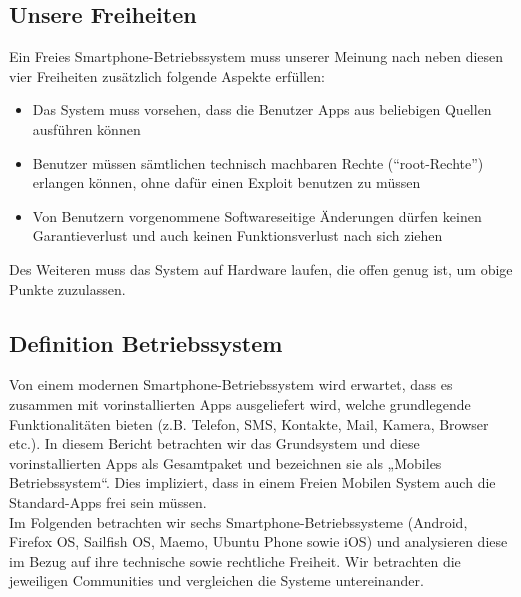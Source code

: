 \subsection{Unsere Freiheiten}
Ein Freies Smartphone-Betriebssystem muss unserer Meinung nach neben diesen vier Freiheiten zusätzlich folgende Aspekte erfüllen:
\begin{itemize}
	\renewcommand\labelitemi{--}
	\item Das System muss vorsehen, dass die Benutzer Apps aus beliebigen Quellen ausführen können
	\item Benutzer müssen sämtlichen technisch machbaren Rechte (\mbox{``root-Rechte''}) erlangen können, ohne dafür einen Exploit benutzen zu müssen
	\item Von Benutzern vorgenommene Softwareseitige Änderungen dürfen keinen Garantieverlust und auch keinen Funktionsverlust nach sich ziehen
\end{itemize}
Des Weiteren muss das System auf Hardware laufen, die offen genug ist, um obige Punkte zuzulassen. \\

\subsection{Definition Betriebssystem}
Von einem modernen Smartphone-Betriebssystem wird erwartet, dass es zusammen mit vorinstallierten Apps ausgeliefert wird, welche grundlegende Funktionalitäten bieten (z.B. Telefon, SMS, Kontakte, Mail, Kamera, Browser etc.). In diesem Bericht betrachten wir das Grundsystem und diese vorinstallierten Apps als Gesamtpaket und bezeichnen sie als „Mobiles Betriebssystem“. Dies impliziert, dass in einem Freien Mobilen System auch die Standard-Apps frei sein müssen.\\

Im Folgenden betrachten wir sechs Smartphone-Betriebssysteme (Android, Firefox OS, Sailfish OS, Maemo, Ubuntu Phone sowie iOS) und analysieren diese im Bezug auf ihre technische sowie rechtliche Freiheit. Wir betrachten die jeweiligen Communities und vergleichen die Systeme untereinander.